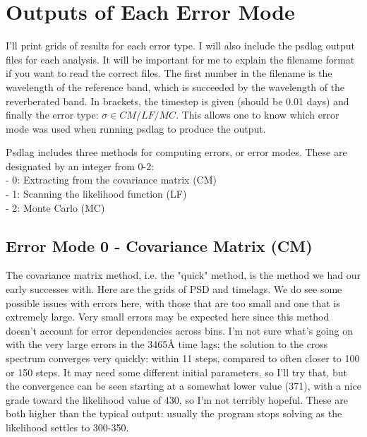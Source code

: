 \documentclass[11pt,letterpaper]{article}
\begin{document}
\section{Outputs of Each Error Mode}
I'll print grids of results for each error type. I will also include the psdlag output files for each analysis. It will be important for me to explain the filename format if you want to read the correct files. The first number in the filename is the wavelength of the reference band, which is succeeded by the wavelength of the reverberated band. In brackets, the timestep is given (should be 0.01 days) and finally the error type: $\sigma \in CM/LF/MC$. This allows one to know which error mode was used when running psdlag to produce the output.

Psdlag includes three methods for computing errors, or error modes. These are designated by an integer from 0-2:\\
- 0: Extracting from the covariance matrix (CM)\\
- 1: Scanning the likelihood function (LF) \\
- 2: Monte Carlo (MC)\\

\subsection{Error Mode 0 - Covariance Matrix (CM)}
The covariance matrix method, i.e. the "quick" method, is the method we had our early successes with. Here are the grids of PSD and timelags. We do see some possible issues with errors here, with those that are too small and one that is extremely large. Very small errors may be expected here since this method doesn't account for error dependencies across bins. I'm not sure what's going on with the very large errors in the 3465\AA$ $ time lags;  the solution to the cross spectrum converges very quickly: within 11 steps, compared to often closer to 100 or 150 steps. It may need some different initial parameters, so I'll try that, but the convergence can be seen starting at a somewhat lower value (371), with a nice grade toward the likelihood value of 430, so I'm not terribly hopeful. These are both higher than the typical output: usually the program stops solving as the likelihood settles to 300-350.
\end{document}
